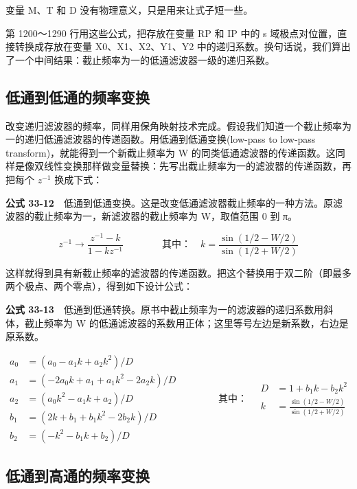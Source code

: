 变量 M、T 和 D 没有物理意义，只是用来让式子短一些。

第 1200～1290 行用这些公式，把存放在变量 RP 和 IP 中的 s
域极点对位置，直接转换成存放在变量 X0、X1、X2、Y1、Y2
中的递归系数。换句话说，我们算出了一个中间结果：截止频率为一的低通滤波器一级的递归系数。

\subsection{低通到低通的频率变换}

改变递归滤波器的频率，同样用保角映射技术完成。假设我们知道一个截止频率为一的递归低通滤波器的传递函数。用低通到低通变换(low-pass
to low-pass transform)，就能得到一个新截止频率为 W
的同类低通滤波器的传递函数。这同样是像双线性变换那样做变量替换：先写出截止频率为一的滤波器的传递函数，再把每个
\(z^{-1}\) 换成下式：

\textbf{公式
33-12}　低通到低通变换。这是改变低通滤波器截止频率的一种方法。原滤波器的截止频率为一，新滤波器的截止频率为
W，取值范围 0 到 π。

\[z^{-1} \rightarrow \frac{z^{-1} - k}{1 - kz^{-1}} \qquad\qquad \text{其中：}\quad k = \frac{\sin(1/2 - W/2)}{\sin(1/2 + W/2)}\]

这样就得到具有新截止频率的滤波器的传递函数。把这个替换用于双二阶（即最多两个极点、两个零点），得到如下设计公式：

\textbf{公式
33-13}　低通到低通转换。原书中截止频率为一的滤波器的递归系数用斜体，截止频率为
W 的低通滤波器的系数用正体；这里等号左边是新系数，右边是原系数。

\[\begin{aligned}
a_0 &= (a_0 - a_1k + a_2k^2)/D \\
a_1 &= (-2a_0k + a_1 + a_1k^2 - 2a_2k)/D \\
a_2 &= (a_0k^2 - a_1k + a_2)/D \\
b_1 &= (2k + b_1 + b_1k^2 - 2b_2k)/D \\
b_2 &= (-k^2 - b_1k + b_2)/D
\end{aligned}
\qquad\qquad
\text{其中：}\quad
\begin{aligned}
D &= 1 + b_1k - b_2k^2 \\
k &= \frac{\sin(1/2 - W/2)}{\sin(1/2 + W/2)}
\end{aligned}\]

\subsection{低通到高通的频率变换}

